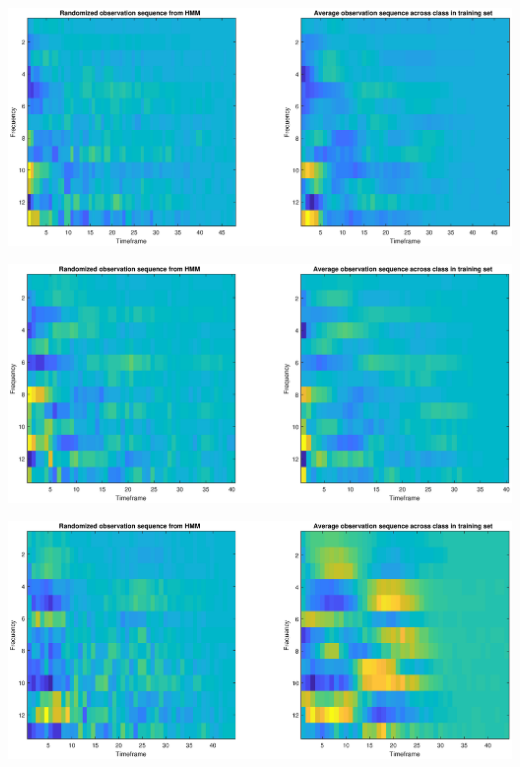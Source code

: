 \documentclass[]{article}
\let\origfigure\figure
\let\endorigfigure\endfigure
\renewenvironment{figure}[1][2] {
    \expandafter\origfigure\expandafter[H]
} {
    \endorigfigure
}
\begin{document}
\begin{figure}
\centering
\includegraphics{../Results/randCompClass2.eps}
\caption{Randomized vs training data class two}
\end{figure}

\begin{figure}
\centering
\includegraphics{../Results/randCompClass3.eps}
\caption{Randomized vs training data class three}
\end{figure}

\begin{figure}
\centering
\includegraphics{../Results/randCompClass4.eps}
\caption{Randomized vs training data class four}
\end{figure}
\end{document}
